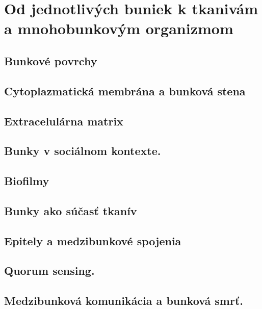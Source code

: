 \section{Od jednotlivých buniek k tkanivám a mnohobunkovým organizmom}

\subsection*{Bunkové povrchy}

\subsection*{Cytoplazmatická membrána a bunková stena}

\subsection*{Extracelulárna matrix}

\subsection*{Bunky v sociálnom kontexte.}

\subsection*{Biofilmy}

\subsection*{Bunky ako súčasť tkanív}

\subsection*{Epitely a medzibunkové spojenia}

\subsection*{Quorum sensing.}

\subsection*{Medzibunková komunikácia a bunková smrť.}
